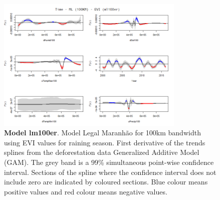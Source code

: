\begin{table}

\begin{figure}[H]
 \centering
        \centering
        \includegraphics[width=0.8\textwidth]{ml100er.png} %
        \caption[Model Legal Maranhão for 100km bandwidth using EVI values for raining season. First derivative of the trends splines from the deforestation data Generalized Additive Model (GAM)]{\textbf{Model lm100er}. Model Legal Maranhão for 100km bandwidth using EVI values for raining season. First derivative of the trends splines from the deforestation data Generalized Additive Model (GAM). The grey band is a 99\% simultaneous point-wise confidence interval. Sections of the spline where the confidence interval does not include zero are indicated by coloured sections. Blue colour means positive values and red colour means negative values.}
        \centering
\end{figure}
\end{table}

